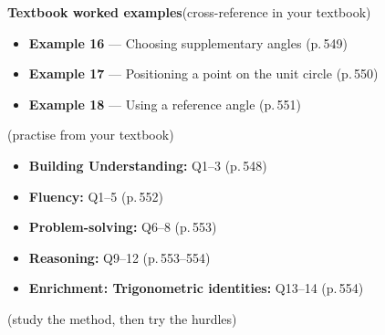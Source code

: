 \documentclass[11pt]{article}
\begin{document}
\begin{refbox}
{\bfseries\color{chalkdk}Textbook worked examples}\;\textcolor{inksoft}{\small(cross-reference in your textbook)}\\[3pt]
\begin{itemize}[leftmargin=16pt,itemsep=1pt,topsep=2pt]
  \item \textbf{Example 16} --- Choosing supplementary angles \textcolor{inksoft}{(p.\,549)}
  \item \textbf{Example 17} --- Positioning a point on the unit circle \textcolor{inksoft}{(p.\,550)}
  \item \textbf{Example 18} --- Using a reference angle \textcolor{inksoft}{(p.\,551)}
\end{itemize}
\;\textcolor{inksoft}{\small(practise from your textbook)}\\[3pt]
\begin{itemize}[leftmargin=16pt,itemsep=1pt,topsep=2pt]
  \item \textbf{Building Understanding:} Q1--3 \textcolor{inksoft}{(p.\,548)}
  \item \textbf{Fluency:} Q1--5 \textcolor{inksoft}{(p.\,552)}
  \item \textbf{Problem-solving:} Q6--8 \textcolor{inksoft}{(p.\,553)}
  \item \textbf{Reasoning:} Q9--12 \textcolor{inksoft}{(p.\,553--554)}
  \item \textbf{Enrichment: Trigonometric identities:} Q13--14 \textcolor{inksoft}{(p.\,554)}
\end{itemize}\end{refbox}

\;\textcolor{inksoft}{\small(study the method, then try the hurdles)}\par
\end{document}
